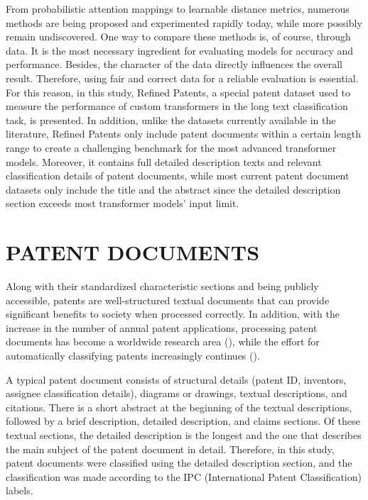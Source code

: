 \documentclass{iyte}
\begin{document}
From probabilistic attention mappings to learnable distance metrics, numerous methods are being proposed and experimented rapidly today, while more possibly remain undiscovered. One way to compare these methods is, of course, through data. It is the most necessary ingredient for evaluating models for accuracy and performance. Besides, the character of the data directly influences the overall result. Therefore, using fair and correct data for a reliable evaluation is essential. For this reason, in this study, Refined Patents, a special patent dataset used to measure the performance of custom transformers in the long text classification task, is presented. In addition, unlike the datasets currently available in the literature, Refined Patents only include patent documents within a certain length range to create a challenging benchmark for the most advanced transformer models. Moreover, it contains full detailed description texts and relevant classification details of patent documents, while most current patent document datasets only include the title and the abstract since the detailed description section exceeds most transformer models' input limit.

\chapter{PATENT DOCUMENTS}

Along with their standardized characteristic sections and being publicly accessible, patents are well-structured textual documents that can provide significant benefits to society when processed correctly. In addition, with the increase in the number of annual patent applications, processing patent documents has become a worldwide research area (\citealt{current_challenges}), while the effort for automatically classifying patents increasingly continues (\citealt{automation_of_patent_cls}).

A typical patent document consists of structural details (patent ID, inventors, assignee classification details), diagrams or drawings, textual descriptions, and citations. There is a short abstract at the beginning of the textual descriptions, followed by a brief description, detailed description, and claims sections. Of these textual sections, the detailed description is the longest and the one that describes the main subject of the patent document in detail. Therefore, in this study, patent documents were classified using the detailed description section, and the classification was made according to the IPC (International Patent Classification) labels. 
\end{document}
